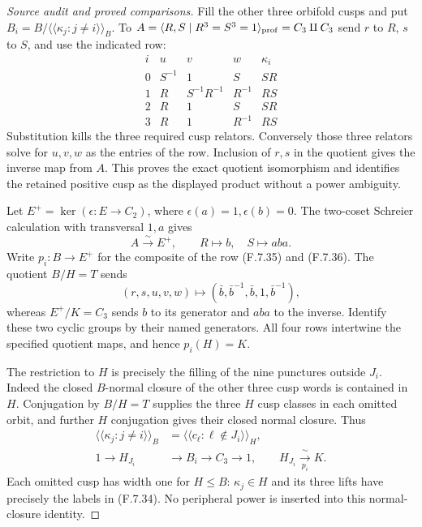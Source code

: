 \begin{proof}[Source audit and proved comparisons]
Fill the other three orbifold cusps and put
$B_i=B/\langle\!\langle\kappa_j:j\ne i\rangle\!\rangle_B$.
To
$A=\langle R,S\mid R^3=S^3=1\rangle_{\rm prof}=C_3\amalg C_3$
send $r$ to $R$, $s$ to $S$, and use the indicated row:
\[
 \begin{array}{c|ccc|c}
 i&u&v&w&\kappa_i\\ \hline
 0&S^{-1}&1&S&SR\\
 1&R&S^{-1}R^{-1}&R^{-1}&RS\\
 2&R&1&S&SR\\
 3&R&1&R^{-1}&RS
 \end{array}                                                \tag{F.7.35}
\]
Substitution kills the three required cusp relators.
Conversely those three relators solve for $u,v,w$
as the entries of the row. Inclusion of $r,s$ in
the quotient gives the inverse map from $A$.
This proves the exact quotient isomorphism and
identifies the retained positive cusp as the
displayed product without a power ambiguity.

Let $E^+=\ker(\epsilon:E\to C_2)$, where
$\epsilon(a)=1,\epsilon(b)=0$.
The two-coset Schreier calculation with transversal
$1,a$ gives
\[
 A\xrightarrow{\ \sim\ }E^+,\qquad
                  R\longmapsto b,\quad S\longmapsto aba.
                                                               \tag{F.7.36}
\]
Write $p_i:B\to E^+$ for the composite of the row
(F.7.35) and (F.7.36).
The quotient $B/H=T$ sends
\[
 (r,s,u,v,w)\longmapsto
       (\bar b,\bar b^{-1},\bar b,1,\bar b^{-1}),
\]
whereas $E^+/K=C_3$ sends $b$ to its generator
and $aba$ to the inverse. Identify these two cyclic
groups by their named generators.
All four rows intertwine the specified quotient maps,
and hence $p_i(H)=K$.

The restriction to $H$ is precisely the filling
of the nine punctures outside $J_i$.
Indeed the closed $B$-normal closure of the other
three cusp words is contained in $H$.
Conjugation by $B/H=T$ supplies the three $H$ cusp
classes in each omitted orbit, and further
$H$ conjugation gives their closed normal closure.
Thus
\[
 \begin{split}
 \langle\!\langle\kappa_j:j\ne i\rangle\!\rangle_B
 &=\langle\!\langle c_\ell:\ell\notin J_i
                                      \rangle\!\rangle_H,\\
 1\longrightarrow H_{J_i}&\longrightarrow B_i
                 \longrightarrow C_3\longrightarrow1,
       \qquad H_{J_i}\xrightarrow[\ p_i\ ]{\ \sim\ }K .
 \end{split}                                                \tag{F.7.37}
\]
Each omitted cusp has width one for $H\leq B$:
$\kappa_j\in H$ and its three lifts have precisely
the labels in (F.7.34). No peripheral power is
inserted into this normal-closure identity.


\end{proof}
